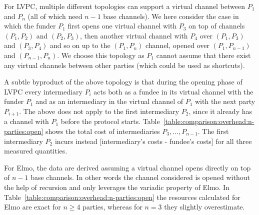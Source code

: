   For LVPC, multiple different topologies can support a virtual channel between
  $P_1$ and $P_n$ (all of which need $n-1$ base channels). We here consider the
  case in which the funder $P_1$ first opens one virtual channel with $P_3$ on
  top of channels $(P_1, P_2)$ and $(P_2, P_3)$, then another virtual channel
  with $P_4$ over $(P_1, P_3)$ and $(P_3, P_4)$ and so on up to the $(P_1, P_n)$
  channel, opened over $(P_1, P_{n-1})$ and $(P_{n-1}, P_n)$. We choose this
  topology as $P_1$ cannot assume that there exist any virtual channels between
  other parties (which could be used as shortcuts).

  A subtle byproduct of the above topology is that during the opening phase of
  LVPC every intermediary $P_i$ acts both as a fundee in its virtual channel
  with the funder $P_1$ and as an intermediary in the virtual channel of $P_1$
  with the next party $P_{i+1}$. The above does not apply to the first
  intermediary $P_2$, since it already has a channel with $P_1$ before the
  protocol starts. Table~\ref{table:comparison:overhead:n-parties:open} shows
  the total cost of intermediaries $P_3, \dots, P_{n-1}$. The first intermediary
  $P_2$ incurs instead [intermediary's costs - fundee's costs] for all three
  measured quantities.

  For Elmo, the data are derived assuming a virtual channel opens directly on
  top of $n-1$ base channels. In other words the channel considered is opened
  without the help of recursion and only leverages the variadic property of
  Elmo. In Table~\ref{table:comparison:overhead:n-parties:open} the resources
  calculated for Elmo are exact for $n \geq 4$ parties, whereas for $n = 3$ they
  slightly overestimate.

